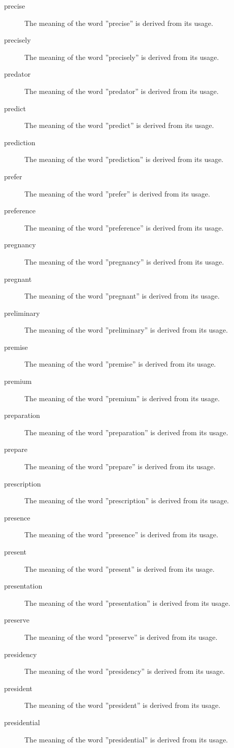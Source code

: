 \documentclass[12pt, letterpaper]{memoir}
\begin{document}
\begin{description}
\item[precise] The meaning of the word ''precise'' is derived from its usage.
\item[precisely] The meaning of the word ''precisely'' is derived from its usage.
\item[predator] The meaning of the word ''predator'' is derived from its usage.
\item[predict] The meaning of the word ''predict'' is derived from its usage.
\item[prediction] The meaning of the word ''prediction'' is derived from its usage.
\item[prefer] The meaning of the word ''prefer'' is derived from its usage.
\item[preference] The meaning of the word ''preference'' is derived from its usage.
\item[pregnancy] The meaning of the word ''pregnancy'' is derived from its usage.
\item[pregnant] The meaning of the word ''pregnant'' is derived from its usage.
\item[preliminary] The meaning of the word ''preliminary'' is derived from its usage.
\item[premise] The meaning of the word ''premise'' is derived from its usage.
\item[premium] The meaning of the word ''premium'' is derived from its usage.
\item[preparation] The meaning of the word ''preparation'' is derived from its usage.
\item[prepare] The meaning of the word ''prepare'' is derived from its usage.
\item[prescription] The meaning of the word ''prescription'' is derived from its usage.
\item[presence] The meaning of the word ''presence'' is derived from its usage.
\item[present] The meaning of the word ''present'' is derived from its usage.
\item[presentation] The meaning of the word ''presentation'' is derived from its usage.
\item[preserve] The meaning of the word ''preserve'' is derived from its usage.
\item[presidency] The meaning of the word ''presidency'' is derived from its usage.
\item[president] The meaning of the word ''president'' is derived from its usage.
\item[presidential] The meaning of the word ''presidential'' is derived from its usage.

\end{description}
\end{document}
